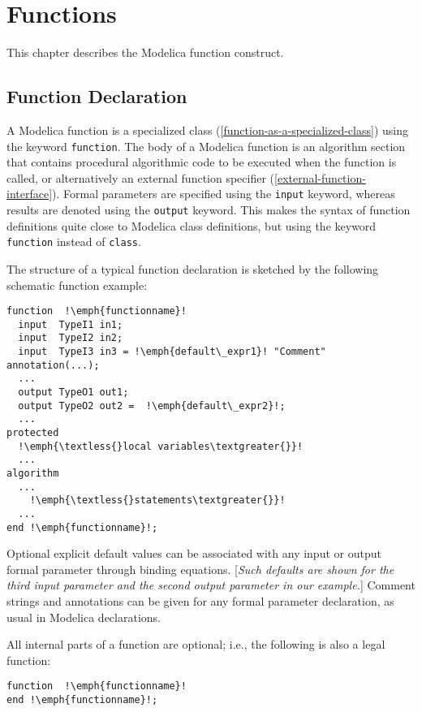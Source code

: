 \chapter{Functions}

This chapter describes the Modelica function construct.

\section{Function Declaration}

A Modelica function is a specialized class (\autoref{function-as-a-specialized-class}) using the
keyword \lstinline!function!. The body of a Modelica function is an algorithm
section that contains procedural algorithmic code to be executed when
the function is called, or alternatively an external function specifier
(\autoref{external-function-interface}). Formal parameters are specified using the \lstinline!input! keyword,
whereas results are denoted using the \lstinline!output! keyword. This makes the
syntax of function definitions quite close to Modelica class
definitions, but using the keyword \lstinline!function! instead of \lstinline!class!.

\begin{nonnormative}
The structure of a typical function declaration is sketched by
the following schematic function example:
\begin{lstlisting}[language=modelica,escapechar=!]
function  !\emph{functionname}!
  input  TypeI1 in1;
  input  TypeI2 in2;
  input  TypeI3 in3 = !\emph{default\_expr1}! "Comment" annotation(...);
  ...
  output TypeO1 out1;
  output TypeO2 out2 =  !\emph{default\_expr2}!;
  ...
protected
  !\emph{\textless{}local variables\textgreater{}}!
  ...
algorithm
  ...
    !\emph{\textless{}statements\textgreater{}}!
  ...
end !\emph{functionname}!;
\end{lstlisting}
\end{nonnormative}

Optional explicit default values can be associated with any input or
output formal parameter through binding equations. {[}\emph{Such
defaults are shown for the third input parameter and the second output
parameter in our example.}{]} Comment strings and annotations can be
given for any formal parameter declaration, as usual in Modelica
declarations.

\begin{nonnormative}
All internal parts of a function are optional; i.e., the following is also a legal function:
\begin{lstlisting}[language=modelica,escapechar=!]
function  !\emph{functionname}!
end !\emph{functionname}!;
\end{lstlisting}
\end{nonnormative}

